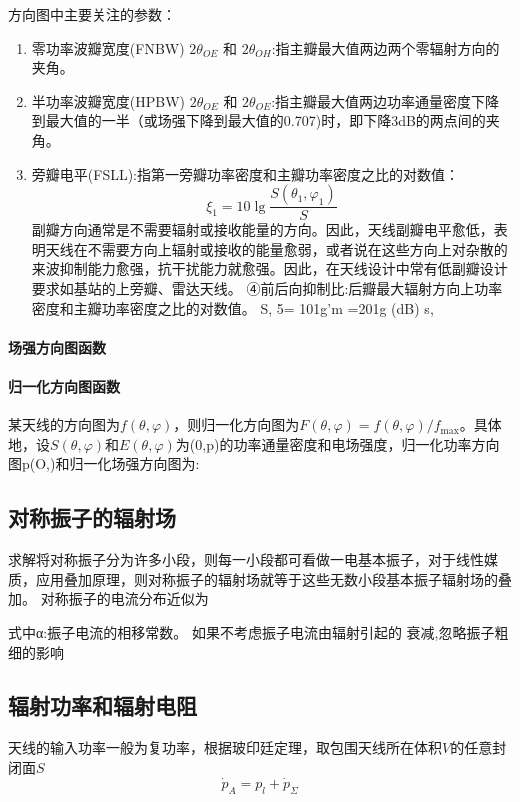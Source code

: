     方向图中主要关注的参数：
    \begin{enumerate}
        \item 零功率波瓣宽度(FNBW) $2\theta_{OE}$ 和 $2\theta_{OH}$:指主瓣最大值两边两个零辐射方向的夹角。
        \item 半功率波瓣宽度(HPBW) $2\theta_{OE}$ 和 $2\theta_{OE}$:指主瓣最大值两边功率通量密度下降到最大值的一半（或场强下降到最大值的0.707)时，即下降3dB的两点间的夹角。
        \item 旁瓣电平(FSLL):指第一旁瓣功率密度和主瓣功率密度之比的对数值：
            \begin{equation}
                \xi_1=10\lg\frac{S(\theta_1,\varphi_1)}{S} 
            \end{equation}
        副瓣方向通常是不需要辐射或接收能量的方向。因此，天线副瓣电平愈低，表明天线在不需要方向上辐射或接收的能量愈弱，或者说在这些方向上对杂散的来波抑制能力愈强，抗干扰能力就愈强。因此，在天线设计中常有低副瓣设计要求如基站的上旁瓣、雷达天线。
        ④前后向抑制比:后瓣最大辐射方向上功率密度和主瓣功率密度之比的对数值。
        S,
        5= 101g'm =201g
        (dB)
        s,
        
    \end{enumerate}


    \paragraph{场强方向图函数}

    \paragraph{归一化方向图函数}
    某天线的方向图为$f(\theta,\varphi)$，则归一化方向图为$F(\theta,\varphi)=f(\theta,\varphi)/f_\mathrm{max}$。具体地，设$S(\theta,\varphi)$和$E(\theta,\varphi)$为(0,p)的功率通量密度和电场强度，归一化功率方向图p(O,)和归一化场强方向图为:

    \subsection{对称振子的辐射场}
    求解将对称振子分为许多小段，则每一小段都可看做一电基本振子，对于线性媒质，应用叠加原理，则对称振子的辐射场就等于这些无数小段基本振子辐射场的叠加。
    对称振子的电流分布近似为

    式中α:振子电流的相移常数。
    如果不考虑振子电流由辐射引起的
    衰减,忽略振子粗细的影响

    \subsection{辐射功率和辐射电阻}
    天线的输入功率一般为复功率，根据玻印廷定理，取包围天线所在体积$V$的任意封闭面$S$
    \begin{equation}
        \dot{p}_A=p_l+\dot{p}_\Sigma
    \end{equation}

